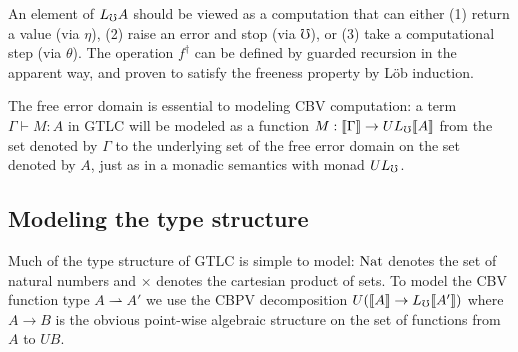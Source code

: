%
An element of $L_\mho A$ should be viewed as a computation that can either (1)
return a value (via $\eta$), (2) raise an error and stop (via $\mho$), or (3)
take a computational step (via $\theta$).
%
The operation $f^\dagger$ can be defined by guarded recursion in the
apparent way, and proven to satisfy the freeness property by L\"ob
induction.
%
%




The free error domain is essential to modeling CBV computation: a term
$\Gamma \vdash M : A$ in GTLC will be modeled as a function $M :
\llbracket {\Gamma} \rrbracket \to UL_\mho \llbracket {A} \rrbracket$ from the set denoted by $\Gamma$ to the
underlying set of the free error domain on the set denoted by $A$,
just as in a monadic semantics with monad $UL_\mho$.

\subsection{Modeling the type structure}\label{sec:dynamic-type}
Much of the type structure of GTLC is simple to model: $\text{Nat}$ denotes
the set of natural numbers and $\times$ denotes the cartesian product
of sets. To model the CBV function type $A \rightharpoonup A'$ we use
the CBPV decomposition $U(\llbracket {A} \rrbracket \to L_\mho \llbracket {A'} \rrbracket)$ where $A \to B$
is the obvious point-wise algebraic structure on the set of functions
from $A$ to $UB$.

